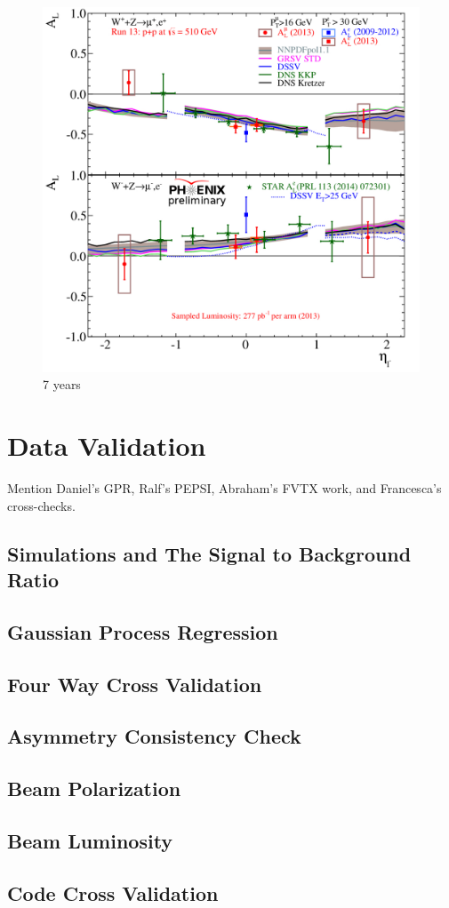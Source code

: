 \begin{figure}[ht]
  \centering
  \includegraphics[width=0.8\linewidth]{./figures/prelim_AL_2bins.jpg}
  \caption{
    7 years
  }
  \label{fig:al_preliminary_standard}
\end{figure}

\clearpage
\section{Data Validation}
Mention Daniel's GPR, Ralf's PEPSI, Abraham's FVTX work, and Francesca's cross-checks.
\subsection{Simulations and The Signal to Background Ratio}
\subsection{Gaussian Process Regression}
\subsection{Four Way Cross Validation}
\subsection{Asymmetry Consistency Check}
\subsection{Beam Polarization}
\subsection{Beam Luminosity}
\subsection{Code Cross Validation}
